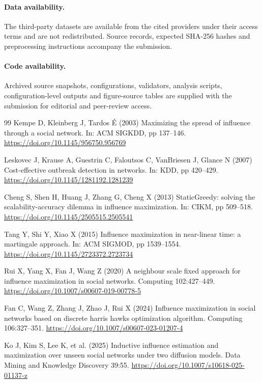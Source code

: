 \documentclass[smallextended]{svjour3}
\begin{document}
\paragraph{Data availability.} The third-party datasets are available from the cited providers under their access terms and are not redistributed. Source records, expected SHA-256 hashes and preprocessing instructions accompany the submission.
\paragraph{Code availability.} Archived source snapshots, configurations, validators, analysis scripts, configuration-level outputs and figure-source tables are supplied with the submission for editorial and peer-review access.
\begin{thebibliography}{99}
 Kempe D, Kleinberg J, Tardos É (2003) Maximizing the spread of influence through a social network. In: ACM SIGKDD, pp 137--146. \url{https://doi.org/10.1145/956750.956769}

 Leskovec J, Krause A, Guestrin C, Faloutsos C, VanBriesen J, Glance N (2007) Cost-effective outbreak detection in networks. In: KDD, pp 420--429. \url{https://doi.org/10.1145/1281192.1281239}

 Cheng S, Shen H, Huang J, Zhang G, Cheng X (2013) StaticGreedy: solving the scalability-accuracy dilemma in influence maximization. In: CIKM, pp 509--518. \url{https://doi.org/10.1145/2505515.2505541}

 Tang Y, Shi Y, Xiao X (2015) Influence maximization in near-linear time: a martingale approach. In: ACM SIGMOD, pp 1539--1554. \url{https://doi.org/10.1145/2723372.2723734}

 Rui X, Yang X, Fan J, Wang Z (2020) A neighbour scale fixed approach for influence maximization in social networks. Computing 102:427--449. \url{https://doi.org/10.1007/s00607-019-00778-5}

 Fan C, Wang Z, Zhang J, Zhao J, Rui X (2024) Influence maximization in social networks based on discrete harris hawks optimization algorithm. Computing 106:327--351. \url{https://doi.org/10.1007/s00607-023-01207-4}

 Ko J, Kim S, Lee K, et al. (2025) Inductive influence estimation and maximization over unseen social networks under two diffusion models. Data Mining and Knowledge Discovery 39:55. \url{https://doi.org/10.1007/s10618-025-01137-z}


\end{thebibliography}
\end{document}
